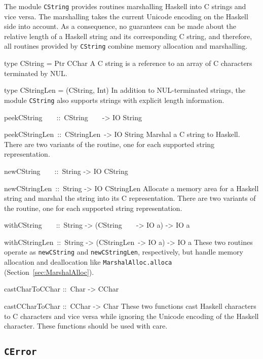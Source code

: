 \documentclass[a4paper,twoside]{article}
\makeatletter
\newcommand{\code}[1]{\texttt{#1}}      %
\newenvironment{codedesc}{%
  \list{}{\labelwidth\z@
    \let\makelabel\codedesclabel}
  }{%
  \endlist
  }
\newcommand*{\codedesclabel}[1]{%
  \hspace{-\leftmargin}
  \parbox[b]{\labelwidth}{\makebox[0pt][l]{\code{#1}}\\}\hfil\relax
  }
\newcommand{\combineitems}{\vspace*{-\itemsep}\vspace*{-\parsep}\vspace*{-1em}}
\makeatother
\begin{document}
The module \code{CString} provides routines marshalling Haskell into C strings
and vice versa.  The marshalling takes the current Unicode encoding on the
Haskell side into account.  As a consequence, no guarantees can be made about
the relative length of a Haskell string and its corresponding C string, and
therefore, all routines provided by \code{CString} combine memory allocation
and marshalling.
%
\begin{codedesc}
\item[type CString = Ptr CChar] A C string is a reference to an array of C
  characters terminated by NUL.

\item[type CStringLen = (CString, Int)] In addition to NUL-terminated strings,
  the module \code{CString} also supports strings with explicit length
  information. 

\item[peekCString~~~~::\ CString~~~~-> IO String]
\item[peekCStringLen~::\ CStringLen~-> IO String]\combineitems
  Marshal a C string to Haskell.  There are two variants of the routine, one
  for each supported string representation.

\item[newCString~~~~::\ String -> IO CString]
\item[newCStringLen~::\ String -> IO CStringLen] \combineitems Allocate a
  memory area for a Haskell string and marshal the string into its C
  representation.  There are two variants of the routine, one for each
  supported string representation.

\item[withCString~~~~::\ String -> (CString~~~~-> IO a) -> IO a]
\item[withCStringLen~::\ String -> (CStringLen~-> IO a) -> IO a] \combineitems
  These two routines operate as \code{newCString} and \code{newCStringLen},
  respectively, but handle memory allocation and deallocation like
  \code{MarshalAlloc.alloca} (Section~\ref{sec:MarshalAlloc}).

\item[castCharToCChar ::\ Char -> CChar]
\item[castCCharToChar ::\ CChar -> Char] \combineitems These two functions cast
  Haskell characters to C characters and vice versa while ignoring the Unicode
  encoding of the Haskell character.  These functions should be used with
  care.
\end{codedesc}

\subsection{\code{CError}}
\label{sec:CError}
\end{document}
